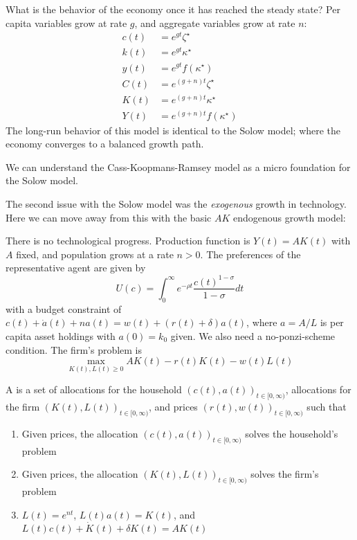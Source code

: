\documentclass[10pt]{article}
\begin{document}
What is the behavior of the economy once it has reached the steady state? Per capita variables grow at rate $g$, and aggregate variables grow at rate $n$:
\begin{align*}
	c(t) &= e^{gt} \zeta^\star \\
	k(t) &= e^{gt} \kappa^\star \\
	y(t) &= e^{gt} f(\kappa^\star) \\
	C(t) &= e^{(g+n)t} \zeta^\star \\
	K(t) &= e^{(g+n)t} \kappa^\star \\
	Y(t) &= e^{(g+n)t} f(\kappa^\star)
\end{align*}
The long-run behavior of this model is identical to the Solow model; where the economy converges to a balanced growth path. 
\begin{remark}
	We can understand the Cass-Koopmans-Ramsey model as a micro foundation for the Solow model.
\end{remark}

The second issue with the Solow model was the \emph{exogenous} growth in technology. Here we can move away from this with the basic $AK$ endogenous growth model:

\begin{model}
	 There is no technological progress. Production function is $Y(t) = AK(t)$ with $A$ fixed, and population grows at a rate $n > 0$. The preferences of the representative agent are given by
	\[
	U(c) = \int_0^\infty e^{-\rho t} \frac{c(t)^{1-\sigma}}{1-\sigma} dt
	\]
	with a budget constraint of $c(t) + \dot{a}(t) + na(t) = w(t) + (r(t) + \delta)a(t)$, where $a = A / L$ is per capita asset holdings with $a(0) = k_0$ given. We also need a no-ponzi-scheme condition. The firm's problem is
	\[
	\max_{K(t),L(t) \ge 0} AK(t) - r(t)K(t) - w(t)L(t)
	\]
\end{model}

\begin{definition}
	A  is a set of allocations for the household $(c(t),a(t))_{t\in[0,\infty)}$, allocations for the firm $(K(t),L(t))_{t\in[0,\infty)}$, and prices $(r(t),w(t))_{t\in[0,\infty)}$ such that
	\begin{enumerate}
		\item Given prices, the allocation $(c(t),a(t))_{t\in[0,\infty)}$ solves the household's problem
		\item Given prices, the allocation $(K(t),L(t))_{t\in[0,\infty)}$ solves the firm's problem
		\item $L(t) = e^{nt}$, $L(t)a(t) = K(t)$, and $L(t)c(t) + \dot{K}(t) + \delta K(t) = AK(t)$
	\end{enumerate}
\end{definition}
\end{document}
